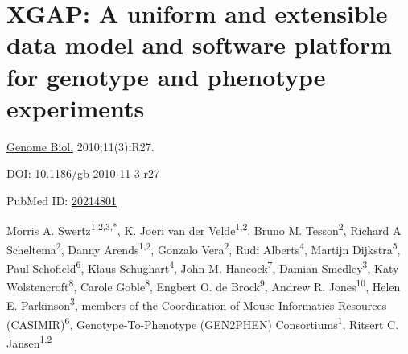 \chapter[XGAP model for genotype and phenotype experiments]{XGAP: A uniform and extensible data model and software platform for genotype and phenotype experiments}
\label{chap:xgap}

{ \Large {} }

\hfill \underline{Genome Biol.} 2010;11(3):R27.

\hfill DOI: \href{https://doi.org/10.1186/gb-2010-11-3-r27}{10.1186/gb-2010-11-3-r27}

\hfill PubMed ID: \href{https://www.ncbi.nlm.nih.gov/pubmed/20214801}{20214801}

\newpage

\noindent
Morris A. Swertz\textsuperscript{1,2,3,*}, K. Joeri van der Velde\textsuperscript{1,2}, Bruno M. Tesson\textsuperscript{2}, Richard A Scheltema\textsuperscript{2}, Danny Arends\textsuperscript{1,2}, Gonzalo Vera\textsuperscript{2}, Rudi Alberts\textsuperscript{4}, Martijn Dijkstra\textsuperscript{5}, Paul Schofield\textsuperscript{6}, Klaus Schughart\textsuperscript{4}, John M. Hancock\textsuperscript{7}, Damian Smedley\textsuperscript{3}, Katy Wolstencroft\textsuperscript{8}, Carole Goble\textsuperscript{8}, Engbert O. de Brock\textsuperscript{9}, Andrew R. Jones\textsuperscript{10}, Helen E. Parkinson\textsuperscript{3}, members of the Coordination of Mouse Informatics Resources (CASIMIR)\textsuperscript{6}, Genotype-To-Phenotype (GEN2PHEN) Consortiums\textsuperscript{1}, Ritsert C. Jansen\textsuperscript{1,2}\\

